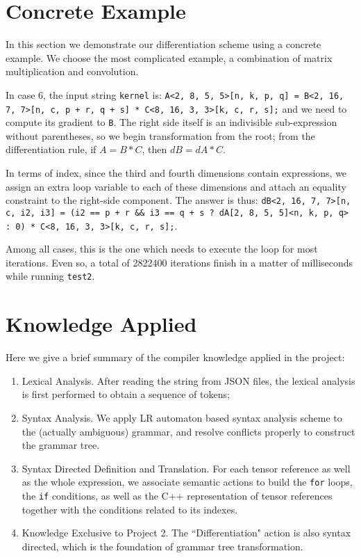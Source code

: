 \documentclass[a4paper,11pt]{article}
\begin{document}
	\section{Concrete Example}
	In this section we demonstrate our differentiation scheme using a concrete example. We choose the most complicated example, a combination of matrix multiplication and convolution. \par 
	In case 6, the input string \texttt{kernel} is: \texttt{A<2, 8, 5, 5>[n, k, p, q] = B<2, 16, 7, 7>[n, c, p + r, q + s] * C<8, 16, 3, 3>[k, c, r, s];} and we need to compute its gradient to \texttt{B}. The right side itself is an indivisible sub-expression without parentheses, so we begin transformation from the root; from the differentiation rule, if $A = B*C$, then $dB = dA* C$. \par 
	In terms of index, since the third and fourth dimensions contain expressions, we assign an extra loop variable to each of these dimensions and attach an equality constraint to the right-side component. The answer is thus: \texttt{dB<2, 16, 7, 7>[n, c, i2, i3] = (i2 == p + r \&\& i3 == q + s ? dA[2, 8, 5, 5]<n, k, p, q> : 0) * C<8, 16, 3, 3>[k, c, r, s];}. \par 
	Among all cases, this is the one which needs to execute the loop for most iterations. Even so, a total of 2822400 iterations finish in a matter of milliseconds while running \texttt{test2}.
	\section{Knowledge Applied}
	Here we give a brief summary of the compiler knowledge applied in the project:
	\begin{enumerate}
		\item Lexical Analysis. After reading the string from JSON files, the lexical analysis is first performed to obtain a sequence of tokens;
		\item Syntax Analysis. We apply LR automaton based syntax analysis scheme to the (actually ambiguous) grammar, and resolve conflicts properly to construct the grammar tree. 
		\item Syntax Directed Definition and Translation. For each tensor reference as well as the whole expression, we associate semantic actions to build the \texttt{for} loops, the \texttt{if} conditions, as well as the C++ representation of tensor references together with the conditions related to its indexes. 
		\item Knowledge Exclusive to Project 2. The ``Differentiation" action is also syntax directed, which is the foundation of grammar tree transformation. 
	\end{enumerate}
	\appendix
\end{document}
